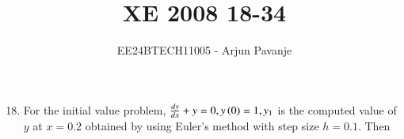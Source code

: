 \documentclass[journal]{IEEEtran}
\begin{document}

\vspace{3cm}
	
\title{XE 2008 18-34}
\author{EE24BTECH11005 - Arjun Pavanje}

{\let\newpage\relax\maketitle}
\begin{enumerate}
\setcounter{enumi}{17}
	\item For the initial value problem,  $\frac{dy}{dx}+y=0, y\left(0\right)=1, y_1$ is the computed value of $y$ at $x=0.2$ obtained by using Euler's method with step size $h=0.1$. Then
		\begin{enumerate}
\end{enumerate}
\end{enumerate}
\end{document}
